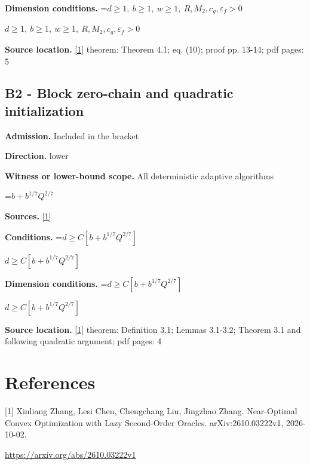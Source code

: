 \documentclass[10pt,a4paper]{article}
\newcommand{\AtlasMath}[1]{\par\begingroup\centering\setbox0=\hbox{$\displaystyle #1$}\ifdim\wd0>1.4\linewidth\typeout{ATLAS WIDE FORMULA: \the\wd0}\fi\ifdim\wd0>\linewidth\resizebox{\linewidth}{!}{\box0}\else\box0\fi\par\endgroup}
\newcommand{\AtlasInlineMath}[1]{\begingroup\setbox0=\hbox{$#1$}\ifdim\wd0>.4\linewidth\endgroup\AtlasMath{#1}\else\endgroup$#1$\fi}
\begin{document}
\textbf{Dimension conditions.} \AtlasInlineMath{d\ge1,\ b\ge1,\ w\ge1,\ R,M_2,c_g,\varepsilon_f>0}

\textbf{Source location.} \href{https://arxiv.org/abs/2610.03222v1}{[1]} theorem: Theorem 4.1; eq. (10); proof pp. 13-14; pdf pages: 5

\subsection{B2 - Block zero-chain and quadratic initialization}
\textbf{Admission.} Included in the bracket

\textbf{Direction.} lower

\textbf{Witness or lower-bound scope.} All deterministic adaptive algorithms

\AtlasMath{b+b^{1/7}Q^{2/7}}
\textbf{Sources.} \href{https://arxiv.org/abs/2610.03222v1}{[1]}

\textbf{Conditions.} \AtlasInlineMath{d\ge C[b+b^{1/7}Q^{2/7}]}

\textbf{Dimension conditions.} \AtlasInlineMath{d\ge C[b+b^{1/7}Q^{2/7}]}

\textbf{Source location.} \href{https://arxiv.org/abs/2610.03222v1}{[1]} theorem: Definition 3.1; Lemmas 3.1-3.2; Theorem 3.1 and following quadratic argument; pdf pages: 4

\section{References}
[1] Xinliang Zhang, Lesi Chen, Chengchang Liu, Jingzhao Zhang. Near-Optimal Convex Optimization with Lazy Second-Order Oracles. arXiv:2610.03222v1, 2026-10-02.

\url{https://arxiv.org/abs/2610.03222v1}
\end{document}
